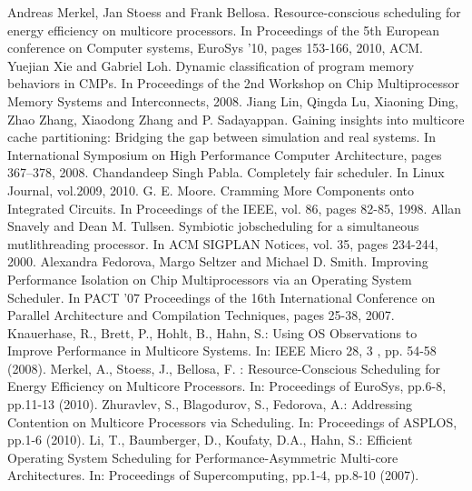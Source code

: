 \documentclass[diploma]{Styles/softlab-thesis}
\begin{document}
\begin{thebibliography}{99}
 Andreas Merkel, Jan Stoess and Frank Bellosa. Resource-conscious scheduling for energy efficiency on multicore processors. In Proceedings of the 5th European conference on Computer systems, EuroSys '10, pages 153-166, 2010, ACM.
 Yuejian Xie and Gabriel Loh. Dynamic classification of program memory behaviors in CMPs. In Proceedings of the 2nd Workshop on Chip Multiprocessor Memory Systems and Interconnects, 2008.
 Jiang Lin, Qingda Lu, Xiaoning Ding, Zhao Zhang, Xiaodong Zhang and P. Sadayappan. Gaining insights into multicore cache partitioning: Bridging the gap between simulation and real systems. In International Symposium on High Performance Computer Architecture, pages 367–378, 2008.
 Chandandeep Singh Pabla. Completely fair scheduler. In Linux Journal, vol.2009, 2010.
 G. E. Moore. Cramming More Components onto Integrated Circuits. In Proceedings of the IEEE, vol. 86, pages 82-85, 1998.
 Allan Snavely and Dean M. Tullsen. Symbiotic jobscheduling for a simultaneous mutlithreading processor. In ACM SIGPLAN Notices, vol. 35, pages 234-244, 2000.
 Alexandra Fedorova, Margo Seltzer and Michael D. Smith. Improving Performance Isolation on Chip Multiprocessors via an Operating System Scheduler. In PACT '07 Proceedings of the 16th International Conference on Parallel Architecture and Compilation Techniques, pages 25-38, 2007.
 Knauerhase, R., Brett, P., Hohlt, B., Hahn, S.: Using OS Observations to Improve Performance in Multicore Systems. In: IEEE Micro 28, 3 , pp. 54-58 (2008).
 Merkel, A., Stoess, J., Bellosa, F. : Resource-Conscious Scheduling for Energy Efficiency on Multicore Processors. In: Proceedings of EuroSys, pp.6-8, pp.11-13 (2010).
 Zhuravlev, S., Blagodurov, S., Fedorova, A.: Addressing Contention on Multicore Processors via Scheduling. In: Proceedings of ASPLOS, pp.1-6 (2010).
 Li, T., Baumberger, D., Koufaty, D.A., Hahn, S.: Efficient Operating System Scheduling for Performance-Asymmetric Multi-core Architectures. In: Proceedings of Supercomputing, pp.1-4, pp.8-10 (2007).


\end{thebibliography}
\end{document}
